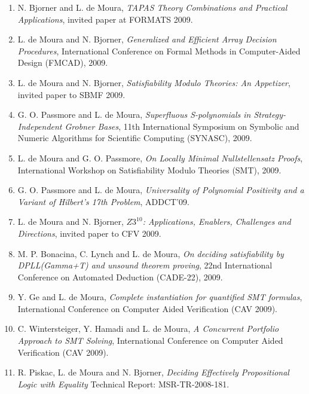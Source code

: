 \documentclass{article}
\begin{document}
\begin{enumerate}
\item N. Bjorner and L. de Moura,
{\em TAPAS Theory Combinations and Practical Applications},
invited paper at FORMATS 2009.

\item L. de Moura and N. Bjorner,
{\em Generalized and Efficient Array Decision Procedures},
International Conference on Formal Methods in Computer-Aided Design (FMCAD), 2009.

\item L. de Moura and N. Bjorner,
{\em Satisfiability Modulo Theories: An Appetizer},
invited paper to SBMF 2009.

\item G. O. Passmore and L. de Moura,
{\em Superfluous S-polynomials in Strategy-Independent Grobner Bases},
11th International Symposium on Symbolic and Numeric Algorithms for Scientific Computing (SYNASC), 2009.

\item L. de Moura and G. O. Passmore,
{\em On Locally Minimal Nullstellensatz Proofs},
International Workshop on Satisfiability Modulo Theories (SMT), 2009.

\item G. O. Passmore and L. de Moura,
{\em Universality of Polynomial Positivity and a Variant of Hilbert's 17th Problem},
ADDCT'09.

\item L. de Moura and N. Bjorner,
{\em $Z3^{10}$: Applications, Enablers, Challenges and Directions},
invited paper to CFV 2009.

\item M. P. Bonacina, C. Lynch and L. de Moura,
{\em On deciding satisfiability by DPLL(Gamma+T) and unsound theorem proving},
22nd International Conference on Automated Deduction (CADE-22), 2009.

\item Y. Ge and L. de Moura,
{\em Complete instantiation for quantified SMT formulas},
International Conference on Computer Aided Verification (CAV 2009).

\item C. Wintersteiger, Y. Hamadi and L. de Moura,
{\em A Concurrent Portfolio Approach to SMT Solving},
International Conference on Computer Aided Verification (CAV 2009).

\item R. Piskac, L. de Moura and N. Bjorner,
{\em Deciding Effectively Propositional Logic with Equality}
Technical Report: MSR-TR-2008-181.


\end{enumerate}
\end{document}
